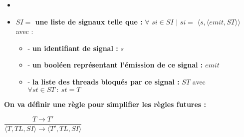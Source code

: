 \documentclass[10pt,a4paper]{report}
\begin{document}
\begin{itemize}
\begin{itemize}
\begin{itemize}
\begin{itemize}
				\end{itemize}
			\end{itemize}	
		\end{itemize}
		\item[]
		\item[] \textbf{$SI =$ une liste de signaux telle que :} $\forall$ $si \in SI$ $|$ $si =$ $\langle s,\langle emit,ST\rangle\rangle$ avec :
		\begin{itemize}
			\item[] - \textbf{un identifiant de signal :} $s$
			\item[] - \textbf{un booléen représentant l'émission de ce signal :} $emit$
			\item[] - \textbf{la liste des threads bloqués par ce signal :} $ST$ avec $\forall st \in ST~:~st = T$
		\end{itemize}
	\end{itemize}
	\bigbreak
	\bigbreak
	
	
	
	
	\textbf{On va définir une règle pour simplifier les règles futures :} 
	\begin{center}
		$\dfrac{T \rightarrow T'}{\langle T,TL,SI\rangle \rightarrow \langle T',TL,SI\rangle}$
	\end{center}
	\bigbreak
	\bigbreak
	
	
	
\end{document}
